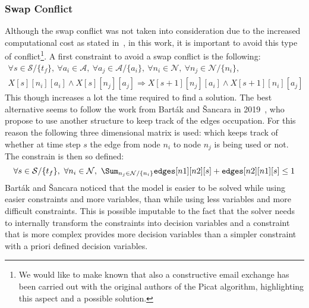\subsubsection{Swap Conflict}
Although the swap conflict was not taken into consideration due to the
increased computational cost as stated in~\cite{picat1}, in this work, it 
is important to avoid this type of conflict\footnote{We would like to make
known that also a constructive email exchange has been carried out with the 
original authors of the Picat algorithm, highlighting this aspect and a 
possible solution.}. A first constraint to avoid a swap conflict is the 
following:
\begin{equation}
  \begin{split}
  \forall s \in\mathcal{S}/\{t_f\},~\forall a_i \in\mathcal{A},~\forall 
  a_j\in \mathcal{A}/\{a_i\},~\forall n_i \in \mathcal{N},~\forall n_j \in 
  \mathcal{N}/\{n_i\},\\
  X[s][n_i][a_i] \wedge X[s][n_j][a_j] \Rightarrow
  X[s+1][n_j][a_i]\wedge X[s+1][n_i][a_j]
  \end{split}
  \label{eq:cplex_no_swaps_no_edges}
\end{equation}
This though increases a lot the time required to find a solution. \newline 
The best alternative seems to follow the work from Bart\'{a}k and \v{S}ancara
in 2019~\cite{picat2}, who propose to use another structure to keep track of
the edges occupation. For this reason the following three dimensional matrix is
used:  which keeps track of whether at
time step $s$ the edge from node $n_i$ to node $n_j$ is being used or not. 
\newline
The constrain is then so defined:
\begin{equation}
  \forall s \in \mathcal{S}/\{t_f\},~\forall n_i \in \mathcal{N},~\Sum_{n_j \in
  \mathcal{N}/\{n_i\}} \texttt{edges}[n1][n2][s] + \texttt{edges}[n2][n1][s]
  \leq 1
  \label{eq:cplex_no_swaps}
\end{equation}
Bart\'{a}k and \v{S}ancara noticed that the model is easier to be solved while
using easier constraints and more variables, than while using less variables
and more difficult constraints. This is possible imputable to the fact that the
solver needs to internally transform the constraints into decision variables
and a constraint that is more complex provides more decision variables than a
simpler constraint with a priori defined decision variables. 
%
